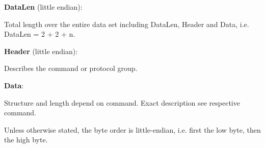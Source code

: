 \begin{DoxyItemize}
\item {\bfseries Data\+Len} (little endian)\+:

Total length over the entire data set including Data\+Len, Header and Data, i.\+e. Data\+Len = 2 + 2 + n.
\item {\bfseries Header} (little endian)\+:

Describes the command or protocol group.
\item {\bfseries Data}\+:

Structure and length depend on command. Exact description see respective command.
\end{DoxyItemize}

Unless otherwise stated, the byte order is little-\/endian, i.\+e. first the low byte, then the high byte.

\subsubsection*{}

\subsubsection*{}